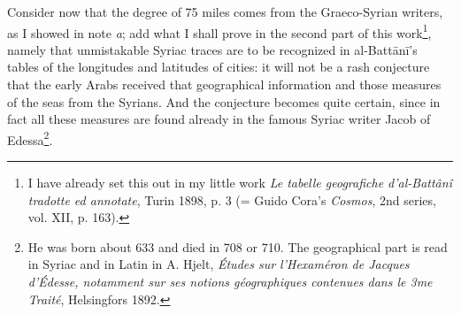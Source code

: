 \documentclass[11pt]{article}
\newcommand{\Pg}[1]{\marginpar{\footnotesize\color{gray}#1}}
\begin{document}
\par \Pg{I 167}Consider now that the degree of 75 miles comes from the Graeco-Syrian writers, as I showed in note \emph{a}; add what I shall prove in the second part of this work\footnote{I have already set this out in my little work \emph{Le tabelle geografiche d’al-Battânî tradotte ed annotate}, Turin 1898, p. 3 (= Guido Cora's \emph{Cosmos}, 2nd series, vol. XII, p. 163).}, namely that unmistakable Syriac traces are to be recognized in al-Battānī's tables of the longitudes and latitudes of cities: it will not be a rash conjecture that the early Arabs received that geographical information and those measures of the seas from the Syrians. And the conjecture becomes quite certain, since in fact all these measures are found already in the famous Syriac writer Jacob of Edessa\footnote{He was born about 633 and died in 708 or 710. The geographical part is read in Syriac and in Latin in A. Hjelt, \emph{Études sur l’Hexaméron de Jacques d’Édesse, notamment sur ses notions géographiques contenues dans le 3me Traité}, Helsingfors 1892.}.\par
\end{document}
